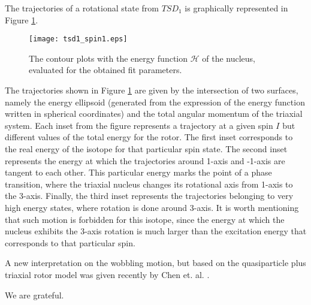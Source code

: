 \documentclass{rjparticle}
\begin{document}
The trajectories of a rotational state from $TSD_1$  is graphically represented in Figure \ref{trajectory}.

\begin{figure}[ht]
    \centering
    \texttt{[image: tsd1\_spin1.eps]}
    \caption{The contour plots with the energy function $\mathcal{H}$ of the nucleus, evaluated for the obtained fit parameters.}
    \label{trajectory}
\end{figure}

The trajectories shown in Figure \ref{trajectory} are given by the intersection of two surfaces, namely the energy ellipsoid (generated from the expression of the energy function written in spherical coordinates) and the total angular momentum of the triaxial system. Each inset from the figure represents a trajectory at a given spin $I$ but different values of the total energy for the rotor. The first inset corresponds to the real energy of the isotope for that particular spin state. The second inset represents the energy at which the trajectories around 1-axis and -1-axis are tangent to each other. This particular energy marks the point of a phase transition, where the triaxial nucleus changes its rotational axis from 1-axis to the 3-axis. Finally, the third inset represents the trajectories belonging to very high energy states, where rotation is done around 3-axis. It is worth mentioning that such motion is forbidden for this isotope, since the energy at which the nucleus exhibits the 3-axis rotation is much larger than the excitation energy that corresponds to that particular spin.

A new interpretation on the wobbling motion, but based on the quasiparticle plus triaxial rotor model was given recently by Chen et. al. \cite{chen2020interpretation}.

\begin{acknowledgement}
We are grateful.
\end{acknowledgement}


\end{document}
